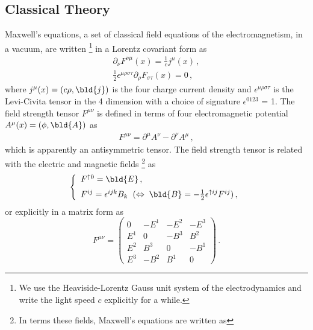 \noindent

\subsection{Classical Theory}
Maxwell's equations,
a set of classical field equations of the electromagnetism,
in a vacuum, 
are written 
\footnote{%
We use the Heaviside-Lorentz Gauss unit system of the electrodynamics and
write the light speed $c$ explicitly for a while.
}%
in a Lorentz covariant form as
\begin{eqnarray}
\partial_\nu F^{\nu \mu}(x) = \frac{1}{c} j^{\mu}(x)\,,
\label{eqn:inhomMxwF}
\\
\frac{1}{2}\epsilon^{\mu \rho \sigma \tau}
\partial_\rho F_{\sigma \tau}(x) = 0
\,,
\label{eqn:homMxwF}
\end{eqnarray}
where
$j^\mu(x) = (c \rho, \bld{j})$ is the four charge current density
and
$\epsilon^{\mu \rho \sigma \tau}$ is the Levi-Civita tensor in the 4 dimension
with a choice of signature $\epsilon^{0123}$ = 1.
The field strength tensor $F^{\mu \nu}$ is defined in terms of
four electromagnetic potential
$A^\mu(x) = (\phi, \bld{A})$ as
\begin{eqnarray}
F^{\mu \nu} = \partial^{\mu} A^{\nu} - \partial^{\nu} A^{\mu}\,,
\label{eqn:FdefinedbyA}
\end{eqnarray}
which is apparently an antisymmetric tensor.
The field strength tensor is related with
the electric and magnetic fields
\footnote{%
In terms these fields, Maxwell's equations are written as
}%
as
\begin{eqnarray}
\left\{
\begin{array}{l}
F^{\uparrow 0} = \bld{E}\,,
\vspace{2mm}
\\
F^{ij} =  \epsilon^{ijk} B_k
\hspace{2mm}
( \Leftrightarrow 
\hspace{1mm}\bld{B} = -\frac{1}{2}\epsilon^{\uparrow ij}F^{ij}  )
\,,
\end{array}
\right.
\label{eqn:FbyEB}
\end{eqnarray}
or explicitly in a matrix form as
\begin{equation}
F^{\mu\nu}
=
\left(
\begin{array}{cccc}
0 & -E^1& -E^2& -E^3 \\
E^1 &0&-B^3& B^2\\
E^2  &B^3&0&-B^1 \\
E^3 &-B^2&B^1& 0
\end{array}
\right)\,.
\label{eqn:FcontentbyEandB} 
\end{equation}
